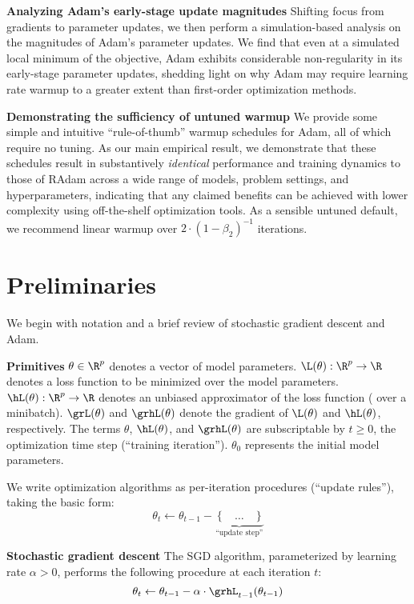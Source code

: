 {\textbf{Analyzing Adam's early-stage update magnitudes}
\quad
Shifting focus from gradients to parameter updates, we then perform a simulation-based analysis on the magnitudes of Adam's parameter updates. We find that even at a simulated local minimum of the objective, Adam exhibits considerable non-regularity in its early-stage parameter updates, shedding light on why Adam may require learning rate warmup to a greater extent than first-order optimization methods.

\textbf{Demonstrating the sufficiency of untuned warmup}
\quad
We provide some simple and intuitive ``rule-of-thumb'' warmup schedules for Adam, all of which require no tuning. As our main empirical result, we demonstrate that these schedules result in substantively \emph{identical} performance and training dynamics to those of RAdam across a wide range of models, problem settings, and hyperparameters, indicating that any claimed benefits can be achieved with lower complexity using off-the-shelf optimization tools. As a sensible untuned default, we recommend linear warmup over $2 \cdot \left( 1 - \beta_2 \right)^{-1}$ iterations.\section{Preliminaries}
\label{sec:prelim}

We begin with notation and a brief review of stochastic gradient descent and Adam.

\textbf{Primitives} \quad $\theta \in \R^p$ denotes a vector of model parameters. $\L(\theta) : \R^p \rightarrow \R$ denotes a loss function to be minimized over the model parameters. $\hL(\theta) : \R^p \rightarrow \R$ denotes an unbiased approximator of the loss function (\eg{} over a minibatch). $\grL(\theta)$ and $\grhL(\theta)$ denote the gradient of $\L(\theta)$ and $\hL(\theta)$, respectively. The terms $\theta$, $\hL(\theta)$, and $\grhL(\theta)$ are subscriptable by $t \geq 0$, the optimization time step (``training iteration''). $\theta_0$ represents the initial model parameters.

We write optimization algorithms as per-iteration procedures (``update rules''), taking the basic form:
\begin{equation*}
    \theta_t \leftarrow \theta_{t - 1} - \underbrace{\left\{~~~~\ldots~~~~\right\}}_{\text{``update step''}}
\end{equation*}

\textbf{Stochastic gradient descent} \quad The SGD algorithm, parameterized by learning rate $\alpha > 0$, performs the following procedure at each iteration $t$:
\begin{equation}
    \theta_t \leftarrow \theta_{t - 1} - \alpha \cdot \grhL_{t - 1}(\theta_{t - 1}) \label{eqn:sgd-update-rule}
\end{equation}

}
